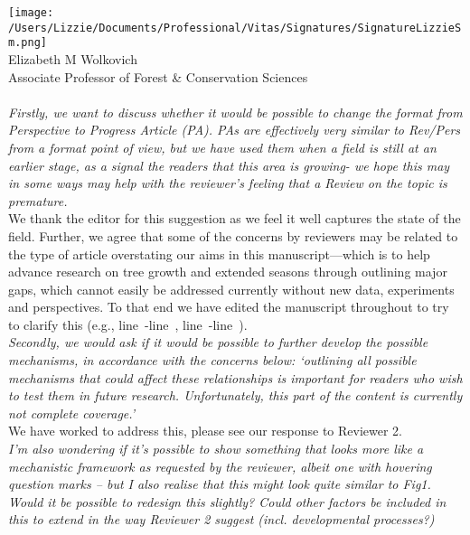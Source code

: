 \documentclass[11pt,a4paper]{article}
\newcommand{\lr}[1]{line~\lineref{#1}}
\begin{document}
\texttt{[image: /Users/Lizzie/Documents/Professional/Vitas/Signatures/SignatureLizzieSm.png]} \\

\noindent Elizabeth M Wolkovich\\
Associate Professor of Forest \& Conservation Sciences\\ 

\newpage
{}  \\

\noindent \emph{Firstly, we want to discuss whether it would be possible to change the format from Perspective to Progress Article (PA). PAs are effectively very similar to Rev/Pers from a format point of view, but we have used them when a field is still at an earlier stage, as a signal the readers that this area is growing- we hope this may in some ways may help with the reviewer’s feeling that a Review on the topic is premature.}\\

\noindent We thank the editor for this suggestion as we feel it well captures the state of the field. Further, we agree that some of the concerns by reviewers may be related to the type of article overstating our aims in this manuscript---which is to help advance research on tree growth and extended seasons through outlining major gaps, which cannot easily be addressed currently without new data, experiments and perspectives. To that end we have edited the manuscript throughout to try to clarify this (e.g., \lr{fornccS}-\lr{fornccE}, \lr{notallmech}-\lr{morebox1}).\\

\noindent \emph{Secondly, we would ask if it would be possible to further develop the possible mechanisms, in accordance with the concerns below:
‘outlining all possible mechanisms that could affect these relationships is important for readers who wish to test them in future research. Unfortunately, this part of the content is currently not complete coverage.’}\\

\noindent We have worked to address this, please see our response to Reviewer 2.\\ 

\noindent \emph{I’m also wondering if it’s possible to show something that looks more like a mechanistic framework as requested by the reviewer, albeit one with hovering question marks -- but I also realise that this might look quite similar to Fig1. Would it be possible to redesign this slightly? Could other factors be included in this to extend in the way Reviewer 2 suggest (incl. developmental processes?)}\\
\end{document}
